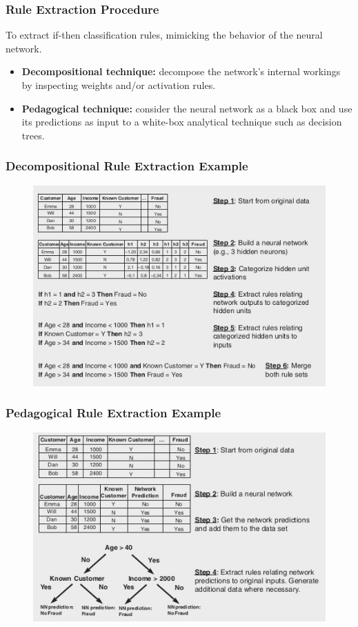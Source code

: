         \subsubsection{Rule Extraction Procedure}
            To extract if-then classification rules, mimicking the behavior of the neural network.
            \begin{itemize}
                \item \textbf{Decompositional technique:} decompose the network's internal workings by inspecting weights and/or activation rules.
                \item \textbf{Pedagogical technique:} consider the neural network as a black box and use its predictions as input to a white-box analytical technique such as decision trees.
            \end{itemize}
        \subsubsection{Decompositional Rule Extraction Example}
            \begin{figure}[ht!]
                \centering 
                \includegraphics[width=0.6\linewidth]{lecture_15/decompositional.png}
            \end{figure}
        \subsubsection{Pedagogical Rule Extraction Example}
            \begin{figure}[ht!]
                \centering 
                \includegraphics[width=0.6\linewidth]{lecture_15/pedagogical.png}
            \end{figure}
